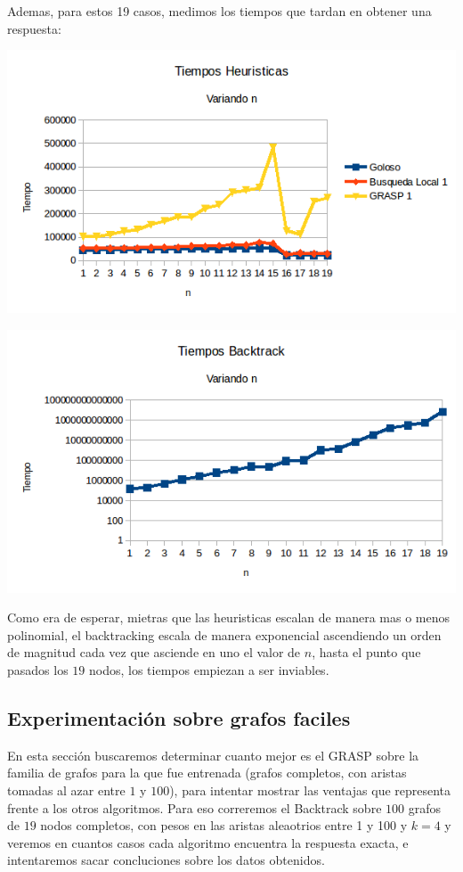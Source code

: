 Ademas, para estos 19 casos, medimos los tiempos que tardan en obtener una respuesta:

\includegraphics[scale=0.5]{Con/tiempos1Back.png}

\includegraphics[scale=0.5]{Con/tiempos1Otros.png}

Como era de esperar, mietras que las heuristicas escalan de manera mas o menos polinomial, el backtracking escala de manera exponencial ascendiendo un orden de magnitud cada vez que asciende en uno el valor de $n$, hasta el punto que pasados los $19$ nodos, los tiempos empiezan a ser inviables.

\subsection{Experimentación sobre grafos faciles}

En esta sección buscaremos determinar cuanto mejor es el GRASP sobre la familia de grafos para la que fue entrenada (grafos completos, con aristas tomadas al azar entre $1$ y $100$), para intentar mostrar las ventajas que representa frente a los otros algoritmos. Para eso correremos el Backtrack sobre $100$ grafos de $19$ nodos completos, con pesos en las aristas aleaotrios entre 1 y 100 y $k = 4$ y veremos en cuantos casos cada algoritmo encuentra la respuesta exacta, e intentaremos sacar concluciones sobre los datos obtenidos.

